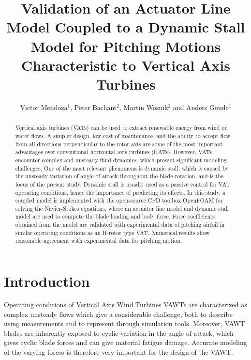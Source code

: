 \documentclass[a4paper]{jpconf}
\begin{document}
\title{Validation of an Actuator Line Model Coupled to a Dynamic Stall Model for
Pitching Motions Characteristic to Vertical Axis Turbines}


\author{Victor Mendoza$^{1}$, Peter Bachant$^{2}$, Martin Wosnik$^{2}$ and Anders Goude$^{1}$ }
\address{$^{1}$ Department of Engineering Sciences, Division of Electricity, Uppsala University, \\Uppsala 751 21, Sweden}
\address{$^{2}$ Center for Ocean Renewable Energy, University of New Hampshire, 24 Colovos Rd.,\\ Durham, NH 03824, USA}

\begin{abstract}
    Vertical axis turbines (VATs) can be used to extract renewable energy from
    wind or water flows. A simpler design, low cost of maintenance, and the
    ability to accept flow from all directions perpendicular to the rotor axis
    are some of the most important advantages over conventional horizontal axis
    turbines (HATs). However, VATs encounter complex and unsteady fluid
    dynamics, which present significant modeling challenges. One of the most
    relevant phenomena is dynamic stall, which is caused by the unsteady
    variation of angle of attack throughout the blade rotation, and is the focus
    of the present study. Dynamic stall is usually used as a passive control for
    VAT operating conditions, hence the importance of predicting its effects. In
    this study, a coupled model is implemented with the open-source CFD
    toolbox OpenFOAM for solving the Navier-Stokes equations, where an actuator
    line model and dynamic stall model are used to compute the blade loading and
    body force. Force coefficients obtained from the model are validated with
    experimental data of pitching airfoil in similar operating conditions as an
    H-rotor type VAT. Numerical results show reasonable agreement with
    experimental data for pitching motion.
\end{abstract}

\section{Introduction}
Operating conditions of Vertical Axis Wind Turbines VAWTs are characterized as complex unsteady flows which
give a considerable challenge, both to describe using measurements and to
represent through simulation tools\cite{huyer1996unsteady}. Moreover, VAWT
blades are inherently exposed to cyclic variation in the angle of attack, which
gives cyclic blade forces and can give material fatigue damage. Accurate
modeling of the varying forces is therefore very important for the design of the
VAWT.
\end{document}
